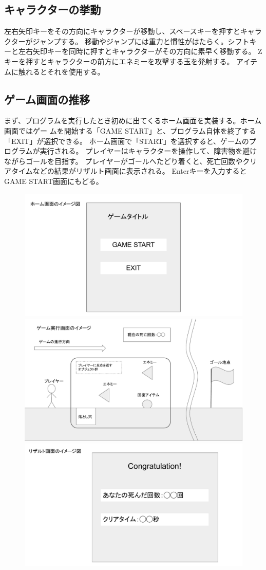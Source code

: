 \documentclass[11pt,a4paper]{jsarticle}
\begin{document}
\subsection{キャラクターの挙動}
左右矢印キーをその方向にキャラクターが移動し、スペースキーを押すとキャラクターがジャンプする。
移動やジャンプには重力と慣性がはたらく。シフトキーと左右矢印キーを同時に押すとキャラクターがその方向に素早く移動する。
Zキーを押すとキャラクターの前方にエネミーを攻撃する玉を発射する。
アイテムに触れるとそれを使用する。

\subsection{ゲーム画面の推移}
まず、プログラムを実行したとき初めに出てくるホーム画面を実装する。ホーム画面ではゲー
ムを開始する「GAME START」と、プログラム自体を終了する「EXIT」が選択できる。
ホーム画面で「START」を選択すると、ゲームのプログラムが実行される。
プレイヤーはキャラクターを操作して、障害物を避けながらゴールを目指す。
プレイヤーがゴールへたどり着くと、死亡回数やクリアタイムなどの結果がリザルト画面に表示される。
Enterキーを入力するとGAME START画面にもどる。

\begin{figure}[htbp]
	\centering
	\includegraphics[width=120mm]{1.pdf}
	\includegraphics[width=120mm]{2.pdf}
	\includegraphics[width=120mm]{3.pdf}
\end{figure}
\end{document}
